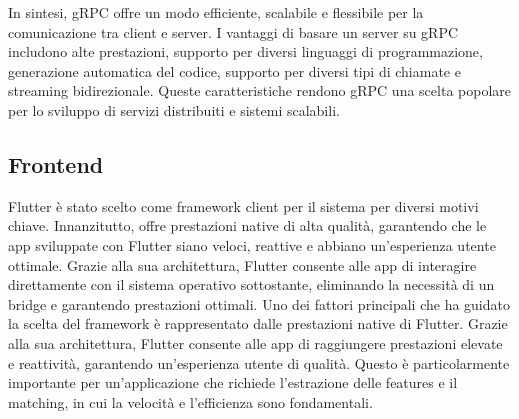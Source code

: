 \documentclass[a4paper,12pt]{report}
\begin{document}
    In sintesi, gRPC offre un modo efficiente, scalabile e flessibile per la comunicazione tra client e server. I vantaggi di basare un server su gRPC includono alte prestazioni, supporto per diversi linguaggi di programmazione, generazione automatica del codice, supporto per diversi tipi di chiamate e streaming bidirezionale. Queste caratteristiche rendono gRPC una scelta popolare per lo sviluppo di servizi distribuiti e sistemi scalabili.

    \newpage    
    \subsection{Frontend}
    Flutter \cite{flutter} è stato scelto come framework client per il sistema per diversi motivi chiave.
    Innanzitutto, offre prestazioni native di alta qualità, garantendo che le app sviluppate con Flutter siano veloci, reattive e abbiano un'esperienza utente ottimale. Grazie alla sua architettura, Flutter consente alle app di interagire direttamente con il sistema operativo sottostante, eliminando la necessità di un bridge e garantendo prestazioni ottimali.
    Uno dei fattori principali che ha guidato la scelta del framework è rappresentato dalle prestazioni native di Flutter. Grazie alla sua architettura, Flutter consente alle app di raggiungere prestazioni elevate e reattività, garantendo un'esperienza utente di qualità. Questo è particolarmente importante per un'applicazione che richiede l'estrazione delle features e il matching, in cui la velocità e l'efficienza sono fondamentali.
    \\
\end{document}
